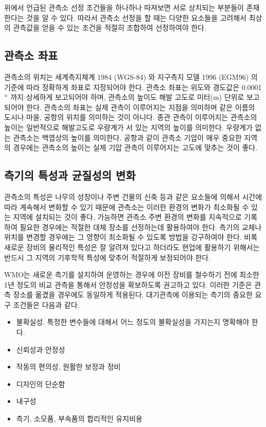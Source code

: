 위에서 언급된 관측소 선정 조건들을 하나하나 따져보면 서로 상치되는 부분들이 존재한다는 것을 알 수 있다. 따라서 관측소 선정을 할 때는 다양한 요소들을 고려해서 최상의 관측값을 얻을 수 있는 조건을 적절히 조합하여 선정하여야 한다.

\subsection{관측소 좌표}
관측소의 위치는 세계측지체계 1984 (WGS-84) 와 지구측지 모델 1996 (EGM96) 의 기준에 따라 정확하게 좌표로 지정되어야 한다. 관측소 좌표는 위도와 경도값은 0.0001 $\rm ^{\circ}$ 까지 상세하게 보고되어야 하며, 관측소의 높이도 해발 고도로 미터(m) 단위로 보고되어야 한다. 관측소의 좌표는 실제 관측이 이루어지는 지점을 의미하며 같은 이름의 도시나 마을, 공항의 위치를 의미하는 것이 아니다. 종관 관측이 이루어지는 관측소의 높이는 일반적으로 해발고도로 우량계가 서 있는 지역의 높이를 의미한다. 우량계가 없는 관측소는 백엽상의 높이를 의미한다. 공항과 같이 관측소 기압이 매우 중요한 지역의 경우에는 관측소의 높이는 실제 기압 관측이 이루어지는 고도에 맞추는 것이 좋다.

\subsection{측기의 특성과 균질성의 변화}
관측소의 특성은 나무의 성장이나 주변 건물의 신축 등과 같은 요소들에 의해서 시간에 따라 계속해서 변화할 수 있기 때문에 관측소는 이러한 환경의 변화가 최소화될 수 있는 지역에 설치되는 것이 좋다. 가능하면 관측소 주변 환경의 변화를 지속적으로 기록하여 필요한 경우에는 적절한 대체 장소를 선정하는데 활용하여야 한다. 측기의 교체나 위치를 변경할 경우에는 그 영향이 최소화될 수 있도록 방법을 강구하여야 한다. 비록 새로운 장비의 물리적인 특성은 잘 알려져 있다고 하더라도 현업에 활용하기 위해서는 반드시 그 지역의 기후학적 특성에 맞추어 적절하게 보정되어야 한다.

WMO는 새로운 측기를 설치하여 운영하는 경우에 이전 장비를 철수하기 전에 최소한 1년 정도의 비교 관측을 통해서 안정성을 확보하도록 권고하고 있다. 이러한 기준은 관측 장소를 옮겼을 경우에도 동일하게 적용된다. 
대기관측에 이용되는 측기의 중요한 요구 조건들은 다음과 같다.

\begin{itemize}
	\item 불확실성. 특정한 변수들에 대해서 어느 정도의 불확실성을 가지는지 명확해야 한다.
	\item  신뢰성과 안정성
	\item 작동의 편의성, 원활한 보정과 정비
	\item 디자인의 단순함
	\item 내구성
	\item 측기, 소모품, 부속품의 합리적인 유지비용
\end{itemize}


